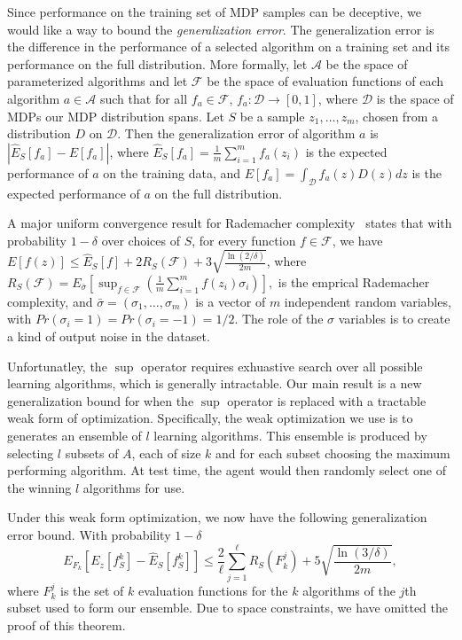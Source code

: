 Since performance on the training set of MDP samples can be deceptive, we would like a way to bound the {\em generalization error}. The generalization error is the difference in the performance of a selected algorithm on a training set and its performance on the full distribution. More formally, let $\mathcal{A}$ be the space of parameterized algorithms and let $\mathcal{F}$ be the space of evaluation functions of each algorithm $a \in \mathcal{A}$ such that for all $f_a \in \mathcal{F}$, $f_a : \mathcal{D} \rightarrow [0,1]$, where $\mathcal{D}$ is the space of MDPs our MDP distribution spans. Let $S$ be a sample $z_1,\dots, z_m$, chosen from a distribution $D$ on $\mathcal{D}$. Then the generalization error of algorithm $a$ is $| \hat{E}_S[f_a] - E[f_a] |$, where $\hat{E}_S[f_a]= \frac{1}{m}\sum_{i=1}^m f_a(z_i)$ is the expected performance of $a$ on the training data, and $E[f_a]= \int_\mathcal{D} f_a(z) D(z) dz$ is the expected performance of $a$ on the full distribution.

A major uniform convergence result for Rademacher complexity~\cite{mohri2012foundations} states that with probability $1-\delta$ over choices of $S$,
for every function $f\in \mathcal{F}$, we have 
$E[f(z)] \le \hat{E}_S[f] + 2 R_S(\mathcal{F}) + 3\sqrt{\frac{\ln(2/\delta)}{2m}}$,
where
$R_S (\mathcal{F}) = E_{\bar{\sigma}} [\sup_{f \in \mathcal{F}} (\frac{1}{m} \sum_{i=1}^m f(z_i) \sigma_i )],$
is the emprical Rademacher complexity, and $\bar{\sigma}=(\sigma_1,\dots, \sigma_m)$ is a vector of $m$ independent random variables, with $Pr(\sigma_i =1)=Pr(\sigma_i = -1)=1/2$. The role of the $\sigma$ variables is to create a kind of output noise in the dataset.

Unfortunatley, the $\sup$ operator requires exhuastive search over all possible learning algorithms, which is generally intractable. Our main result is a new generalization bound for when the $\sup$ operator is replaced with a tractable weak form of optimization. Specifically, the weak optimization we use is to generates an ensemble of $l$ learning algorithms. This ensemble is produced by selecting $l$ subsets of $A$, each of size $k$ and for each subset choosing the maximum performing algorithm. At test time, the agent would then randomly select one of the winning $l$ algorithms for use.

Under this weak form optimization, we now have the following generalization error bound.
With probability $1-\delta$
$$E_{{F_k}}[ E_z[f^k_S] - \hat{E}_S[f^k_S] ] \leq \frac{2}{\ell} \sum_{j=1}^\ell R_S(F^j_k)+ 5\sqrt{\frac{\ln (3/\delta)}{2m}},$$
where $F_k^j$ is the set of $k$ evaluation functions for the $k$ algorithms of the $j$th subset used to form our ensemble. Due to space constraints, we have omitted the proof of this theorem.

